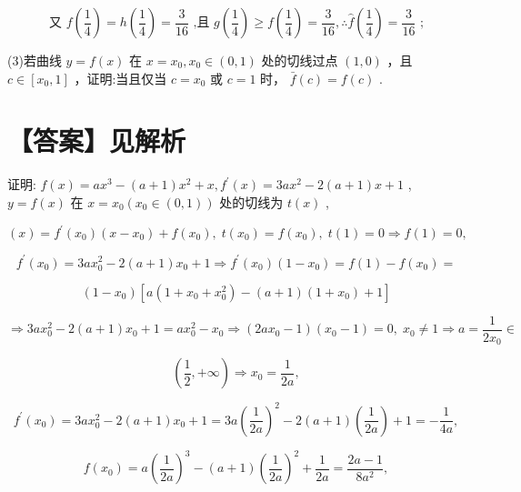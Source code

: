\documentclass[10pt]{article}
\begin{document}
\[
\text{ 又 }f\left( \frac{1}{4}\right)  = h\left( \frac{1}{4}\right)  = \frac{3}{16}\text{ ,且 }g\left( \frac{1}{4}\right)  \geq  f\left( \frac{1}{4}\right)  = \frac{3}{16},\therefore \widehat{f}\left( \frac{1}{4}\right)  = \frac{3}{16}\text{ ; }
\]

(3)若曲线 \(y = f\left( x\right)\) 在 \(x = {x}_{0},{x}_{0} \in  \left( {0,1}\right)\) 处的切线过点 \(\left( {1,0}\right)\) ，且 \(c \in  \left\lbrack  {{x}_{0},1}\right\rbrack\) ，证明:当且仅当 \(c = {x}_{0}\) 或 \(c = 1\) 时， \(\bar{f}\left( c\right)  = f\left( c\right)\) .

\section*{【答案】见解析}

证明: \(f\left( x\right)  = a{x}^{3} - \left( {a + 1}\right) {x}^{2} + x,{f}^{\prime }\left( x\right)  = {3a}{x}^{2} - 2\left( {a + 1}\right) x + 1\) , \(y = f\left( x\right)\) 在 \(x = {x}_{0}\left( {{x}_{0} \in  \left( {0,1}\right) }\right)\) 处的切线为 \(t\left( x\right)\) ,

\[
\left( x\right)  = {f}^{\prime }\left( {x}_{0}\right) \left( {x - {x}_{0}}\right)  + f\left( {x}_{0}\right) ,\;t\left( {x}_{0}\right)  = f\left( {x}_{0}\right) ,\;t\left( 1\right)  = 0 \Rightarrow  f\left( 1\right)  = 0,
\]

\[
{f}^{\prime }\left( {x}_{0}\right)  = {3a}{x}_{0}^{2} - 2\left( {a + 1}\right) {x}_{0} + 1 \Rightarrow  {f}^{\prime }\left( {x}_{0}\right) \left( {1 - {x}_{0}}\right)  = f\left( 1\right)  - f\left( {x}_{0}\right)  =
\]

\[
\left( {1 - {x}_{0}}\right) \left\lbrack  {a\left( {1 + {x}_{0} + {x}_{0}^{2}}\right)  - \left( {a + 1}\right) \left( {1 + {x}_{0}}\right)  + 1}\right\rbrack
\]

\[
\Rightarrow  {3a}{x}_{0}^{2} - 2\left( {a + 1}\right) {x}_{0} + 1 = a{x}_{0}^{2} - {x}_{0} \Rightarrow  \left( {{2a}{x}_{0} - 1}\right) \left( {{x}_{0} - 1}\right)  = 0,\;{x}_{0} \neq  1 \Rightarrow  a = \frac{1}{2{x}_{0}} \in
\]

\[
\left( {\frac{1}{2}, + \infty }\right)  \Rightarrow  {x}_{0} = \frac{1}{2a},
\]

\[
{f}^{\prime }\left( {x}_{0}\right)  = {3a}{x}_{0}^{2} - 2\left( {a + 1}\right) {x}_{0} + 1 = {3a}{\left( \frac{1}{2a}\right) }^{2} - 2\left( {a + 1}\right) \left( \frac{1}{2a}\right)  + 1 =  - \frac{1}{4a},
\]

\[
f\left( {x}_{0}\right)  = a{\left( \frac{1}{2a}\right) }^{3} - \left( {a + 1}\right) {\left( \frac{1}{2a}\right) }^{2} + \frac{1}{2a} = \frac{{2a} - 1}{8{a}^{2}},
\]
\end{document}
